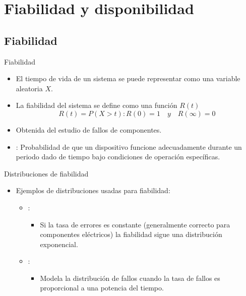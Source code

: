 \section{Fiabilidad y disponibilidad}

\subsection{Fiabilidad}

\begin{frame}[t]{Fiabilidad}
\begin{itemize}
  \item El tiempo de vida de un sistema se puede representar como una variable aleatoria
        $X$.

  \item La fiabilidad del sistema se define como una función $R(t)$
\begin{displaymath}
R(t) = P(X > t) : R(0) = 1 \quad y \quad R(\infty) = 0
\end{displaymath}

  \item Obtenida del estudio de fallos de componentes.

  \item {}:
        Probabilidad de que un dispositivo funcione adecuadamente
        durante un periodo dado de tiempo 
        bajo condiciones de operación específicas.
        
\end{itemize}
\end{frame}

\begin{frame}[t]{Distribuciones de fiabilidad}
\begin{itemize}
  \item Ejemplos de distribuciones usadas para fiabilidad:
    \begin{itemize}
      \item {}:
        \begin{itemize}
          \item Si la tasa de errores es constante 
                (generalmente correcto para componentes eléctricos)
                la fiabilidad sigue una distribución exponencial.
        \end{itemize}
      \item {}:
        \begin{itemize}
          \item Modela la distribución de fallos cuando la tasa de fallos es
                proporcional a una potencia del tiempo.
        \end{itemize}
    \end{itemize}
\end{itemize}
\end{frame}


